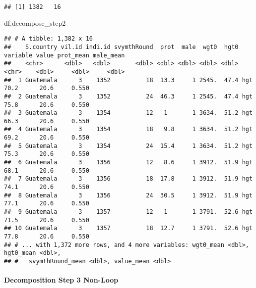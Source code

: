 \documentclass[
]{book}
\newenvironment{Shaded}{\begin{snugshade}}{\end{snugshade}}
\newcommand{\NormalTok}[1]{#1}
\begin{document}
\begin{verbatim}
## [1] 1382   16
\end{verbatim}

\begin{Shaded}
\begin{Highlighting}[]
\NormalTok{df.decompose_step2}
\end{Highlighting}
\end{Shaded}

\begin{verbatim}
## # A tibble: 1,382 x 16
##    S.country vil.id indi.id svymthRound  prot  male  wgt0  hgt0 variable value prot_mean male_mean
##    <chr>      <dbl>   <dbl>       <dbl> <dbl> <dbl> <dbl> <dbl> <chr>    <dbl>     <dbl>     <dbl>
##  1 Guatemala      3    1352          18  13.3     1 2545.  47.4 hgt       70.2      20.6     0.550
##  2 Guatemala      3    1352          24  46.3     1 2545.  47.4 hgt       75.8      20.6     0.550
##  3 Guatemala      3    1354          12   1       1 3634.  51.2 hgt       66.3      20.6     0.550
##  4 Guatemala      3    1354          18   9.8     1 3634.  51.2 hgt       69.2      20.6     0.550
##  5 Guatemala      3    1354          24  15.4     1 3634.  51.2 hgt       75.3      20.6     0.550
##  6 Guatemala      3    1356          12   8.6     1 3912.  51.9 hgt       68.1      20.6     0.550
##  7 Guatemala      3    1356          18  17.8     1 3912.  51.9 hgt       74.1      20.6     0.550
##  8 Guatemala      3    1356          24  30.5     1 3912.  51.9 hgt       77.1      20.6     0.550
##  9 Guatemala      3    1357          12   1       1 3791.  52.6 hgt       71.5      20.6     0.550
## 10 Guatemala      3    1357          18  12.7     1 3791.  52.6 hgt       77.8      20.6     0.550
## # ... with 1,372 more rows, and 4 more variables: wgt0_mean <dbl>, hgt0_mean <dbl>,
## #   svymthRound_mean <dbl>, value_mean <dbl>
\end{verbatim}

\hypertarget{decomposition-step-3-non-loop}{%
\paragraph{Decomposition Step 3 Non-Loop}\label{decomposition-step-3-non-loop}}
\end{document}
